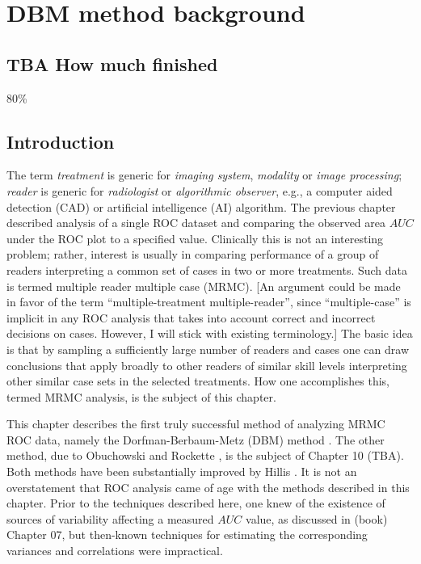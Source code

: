 \documentclass[
]{book}
\begin{document}
\hypertarget{dbm-analysis-background}{%
\chapter{DBM method background}\label{dbm-analysis-background}}

\hypertarget{dbm-analysis-background-how-much-finished}{%
\section{TBA How much finished}\label{dbm-analysis-background-how-much-finished}}

80\%

\hypertarget{dbm-analysis-background-introduction}{%
\section{Introduction}\label{dbm-analysis-background-introduction}}

The term \emph{treatment} is generic for \emph{imaging system}, \emph{modality} or \emph{image processing}; \emph{reader} is generic for \emph{radiologist} or \emph{algorithmic observer}, e.g., a computer aided detection (CAD) or artificial intelligence (AI) algorithm. The previous chapter described analysis of a single ROC dataset and comparing the observed area \(AUC\) under the ROC plot to a specified value. Clinically this is not an interesting problem; rather, interest is usually in comparing performance of a group of readers interpreting a common set of cases in two or more treatments. Such data is termed multiple reader multiple case (MRMC). {[}An argument could be made in favor of the term ``multiple-treatment multiple-reader'', since ``multiple-case'' is implicit in any ROC analysis that takes into account correct and incorrect decisions on cases. However, I will stick with existing terminology.{]} The basic idea is that by sampling a sufficiently large number of readers and cases one can draw conclusions that apply broadly to other readers of similar skill levels interpreting other similar case sets in the selected treatments. How one accomplishes this, termed MRMC analysis, is the subject of this chapter.

This chapter describes the first truly successful method of analyzing MRMC ROC data, namely the Dorfman-Berbaum-Metz (DBM) method \citep{RN204}. The other method, due to Obuchowski and Rockette \citep{RN1450}, is the subject of Chapter 10 (TBA). Both methods have been substantially improved by Hillis \citep{RN1866, RN1865, RN2508}. It is not an overstatement that ROC analysis came of age with the methods described in this chapter. Prior to the techniques described here, one knew of the existence of sources of variability affecting a measured \(AUC\) value, as discussed in (book) Chapter 07, but then-known techniques \citep{RN412} for estimating the corresponding variances and correlations were impractical.
\end{document}
